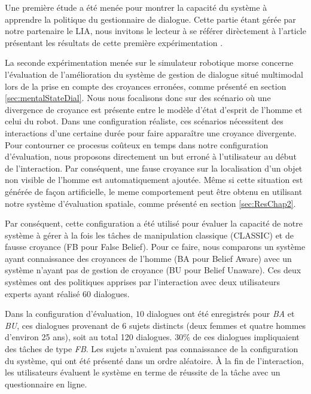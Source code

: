 \documentclass[a4paper,11pt,twoside]{StyleThese}
\begin{document}
Une première étude a été menée pour montrer la capacité du système à apprendre la politique du gestionnaire de dialogue. Cette partie étant gérée par notre partenaire le LIA, nous invitons le lecteur à se référer dirèctement à l'article présentant les résultats de cette première expérimentation \cite{simpar_2014}.

La seconde expérimentation menée sur le simulateur robotique morse concerne l'évaluation de l'amélioration du système de gestion de dialogue situé multimodal lors de la prise en compte des croyances erronées, comme présenté en section \ref{sec:mentalStateDial}.
Nous nous focalisons donc sur des scénario où une divergence de croyance est présente entre le modèle d'état d'esprit de l'homme et celui du robot. 
Dans une configuration réaliste, ces scénarios nécessitent des interactions d'une certaine durée pour faire apparaître une croyance divergente. Pour contourner ce procesus coûteux en temps dans notre configuration d'évaluation, nous proposons directement un but erroné à l'utilisateur au début de l'interaction. 
Par conséquent, une fause croyance sur la localisation d'un objet non visible de l'homme est automatiquement ajoutée. Même si cette situation est générée de façon artificielle, le meme comportement peut être obtenu en utilisant notre système d'évaluation spatiale, comme présenté en section \ref{sec:ResChap2}.

Par conséquent, cette configuration a été utilisé pour évaluer la capacité de notre système à gérer à la fois les tâches de manipulation classique (CLASSIC) et de fausse croyance (FB pour False Belief).
Pour ce faire, nous comparons un système ayant connaissance des croyances de l'homme (BA pour Belief Aware) avec un système n'ayant pas de gestion de croyance (BU pour Belief Unaware). Ces deux systèmes ont des politiques apprises par l'interaction avec deux utilisateurs experts ayant réalisé $60$ dialogues.

Dans la configuration d'évaluation, $10$ dialogues ont été enregistrés pour \textit{BA} et \textit{BU}, ces dialogues provenant de 6 sujets distincts (deux femmes et quatre hommes d'environ 25 ans), soit au total 120 dialogues. $30$\% de ces dialogues impliquaient des tâches de type \textit{FB}. Les sujets n'avaient pas connaissance de la configuration du système, qui ont été présenté dans un ordre aléatoire. À la fin de l'interaction, les utilisateurs évaluent le système en terme de réussite de la tâche avec un questionnaire en ligne.

\end{document}
